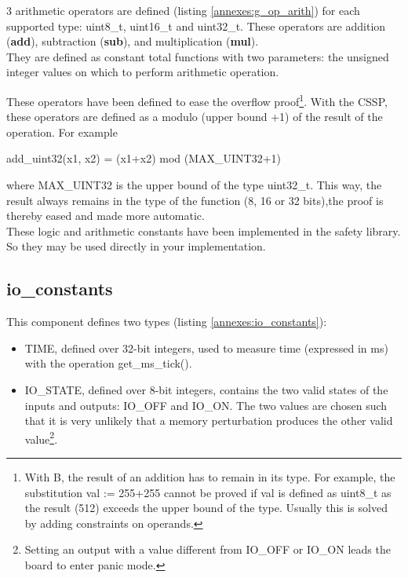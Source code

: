  
3 arithmetic operators are defined (listing \ref{annexes:g_op_arith}) for each supported type: uint8\_t, uint16\_t and uint32\_t. These operators are addition (\textbf{add}), subtraction (\textbf{sub}), and multiplication (\textbf{mul}). \\
They are defined as constant total functions with two parameters: the unsigned integer values on which to perform arithmetic operation. 

These operators have been defined to ease the overflow proof\footnote{With B, the result of an addition has to remain in its type. For example, the substitution val := 255+255 cannot be proved if val is defined as uint8\_t as the result (512) exceeds the upper bound of the type. Usually this is solved by adding constraints on operands. }. With the CSSP, these operators are defined as a modulo (upper bound +1) of the result of the operation. For example \\
\begin{center}
add\_uint32(x1, x2) = (x1+x2) mod (MAX\_UINT32+1)
\end{center} where MAX\_UINT32 is the upper bound of the type uint32\_t. This way, the result always remains in the type of the function (8, 16 or 32 bits),the proof is thereby eased and made more automatic.\\


These logic and arithmetic constants have been implemented in the safety library. So they may be used directly in your implementation.

\subsection{io\_constants}

This component defines two types (listing \ref{annexes:io_constants}):
\begin{itemize}
    \item TIME, defined over 32-bit integers, used to measure time (expressed in ms) with the operation get\_ms\_tick().
    \item IO\_STATE, defined over 8-bit integers, contains the two valid states of the inputs and outputs: IO\_OFF and IO\_ON. The two values are chosen such that it is very unlikely that a memory perturbation produces the other valid value\footnote{Setting an output with a value different from IO\_OFF or IO\_ON leads the board to enter panic mode.}.
\end{itemize}

